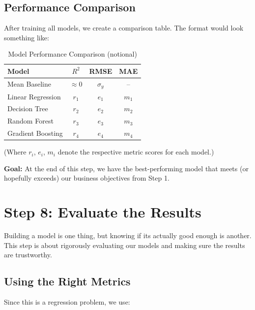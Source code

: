 \documentclass[12pt, a4paper]{article}
\begin{document}
\subsection{Performance Comparison}

After training all models, we create a comparison table. The format would look something like:

\begin{table}[H]
\centering
\caption{Model Performance Comparison (notional)}
\begin{tabular}{lccc}
\toprule
\textbf{Model} & \textbf{$R^2$} & \textbf{RMSE} & \textbf{MAE} \\
\midrule
Mean Baseline & $\approx 0$ & $\sigma_y$ & -- \\
Linear Regression & $r_1$ & $e_1$ & $m_1$ \\
Decision Tree & $r_2$ & $e_2$ & $m_2$ \\
Random Forest & $r_3$ & $e_3$ & $m_3$ \\
Gradient Boosting & $r_4$ & $e_4$ & $m_4$ \\
\bottomrule
\end{tabular}
\end{table}

(Where $r_i$, $e_i$, $m_i$ denote the respective metric scores for each model.)

\textbf{Goal:} At the end of this step, we have the best-performing model that meets (or hopefully exceeds) our business objectives from Step 1.

\newpage

\section{Step 8: Evaluate the Results}

Building a model is one thing, but knowing if its actually good enough is another. This step is about rigorously evaluating our models and making sure the results are trustworthy.

\subsection{Using the Right Metrics}

Since this is a regression problem, we use:
\end{document}
